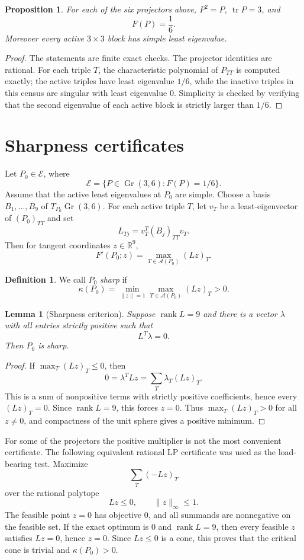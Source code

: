 \documentclass[11pt]{article}
\numberwithin{equation}{section}
\newtheorem{lemma}[theorem]{Lemma}
\newtheorem{proposition}[theorem]{Proposition}
\theoremstyle{definition}
\newtheorem{definition}[theorem]{Definition}
\newcommand{\R}{\mathbb{R}}
\newcommand{\Gr}{\operatorname{Gr}}
\newcommand{\tr}{\operatorname{tr}}
\newcommand{\rank}{\operatorname{rank}}
\newcommand{\cE}{\mathcal E}
\newcommand{\cA}{\mathcal A}
\begin{document}
\begin{proposition}\label{prop:six-tight}
For each of the six projectors above, $P^2=P$, $\tr P=3$, and
\[
  F(P)=\frac16.
\]
Moreover every active $3\times3$ block has simple least eigenvalue.
\end{proposition}

\begin{proof}
The statements are finite exact checks.  The projector identities are rational.
For each triple $T$, the characteristic polynomial of $P_{TT}$ is computed
exactly; the active triples have least eigenvalue $1/6$, while the inactive
triples in this census are singular with least eigenvalue $0$.  Simplicity is
checked by verifying that the second eigenvalue of each active block is strictly
larger than $1/6$.
\end{proof}

\section{Sharpness certificates}

Let $P_0\in\cE$, where
\[
  \cE=\{P\in\Gr(3,6):F(P)=1/6\}.
\]
Assume that the active least eigenvalues at $P_0$ are simple.  Choose a basis
$B_1,\ldots,B_9$ of $T_{P_0}\Gr(3,6)$.  For each active triple $T$, let $v_T$ be
a least-eigenvector of $(P_0)_{TT}$ and set
\[
  L_{Tj}=v_T^T(B_j)_{TT}v_T.
\]
Then for tangent coordinates $z\in\R^9$,
\[
  F'(P_0;z)=\max_{T\in\cA(P_0)} (Lz)_T.
\]

\begin{definition}
We call $P_0$ \emph{sharp} if
\[
  \kappa(P_0)=\min_{\|z\|=1}\max_{T\in\cA(P_0)}(Lz)_T>0.
\]
\end{definition}

\begin{lemma}[Sharpness criterion]\label{lem:sharp-criterion}
Suppose $\rank L=9$ and there is a vector $\lambda$ with all entries strictly
positive such that
\[
  L^T\lambda=0.
\]
Then $P_0$ is sharp.
\end{lemma}

\begin{proof}
If $\max_T(Lz)_T\le0$, then
\[
  0=\lambda^TLz=\sum_T\lambda_T(Lz)_T.
\]
This is a sum of nonpositive terms with strictly positive coefficients, hence
every $(Lz)_T=0$.  Since $\rank L=9$, this forces $z=0$.  Thus
$\max_T(Lz)_T>0$ for all $z\ne0$, and compactness of the unit sphere gives a
positive minimum.
\end{proof}

For some of the projectors the positive multiplier is not the most convenient
certificate.  The following equivalent rational LP certificate was used as the
load-bearing test.  Maximize
\[
  \sum_T(-Lz)_T
\]
over the rational polytope
\[
  Lz\le0,\qquad \|z\|_\infty\le1.
\]
The feasible point $z=0$ has objective $0$, and all summands are nonnegative on
the feasible set.  If the exact optimum is $0$ and $\rank L=9$, then every
feasible $z$ satisfies $Lz=0$, hence $z=0$.  Since $Lz\le0$ is a cone, this proves
that the critical cone is trivial and $\kappa(P_0)>0$.
\end{document}
